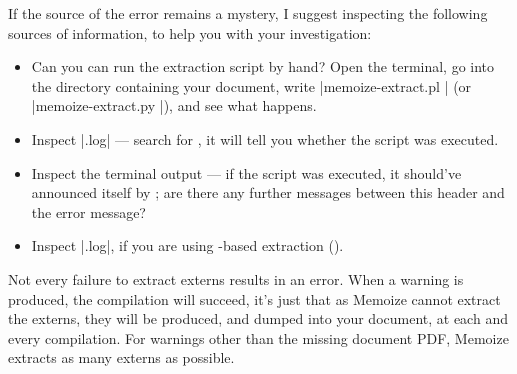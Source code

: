 \documentclass[a4paper,11pt]{article}
\begin{document}
\begin{enumerate}
  If the source of the error remains a mystery, I suggest inspecting the
  following sources of information, to help you with your investigation:
  \begin{itemize}
  \item Can you can run the extraction script by hand?  Open the terminal, go
    into the directory containing your document, write |memoize-extract.pl
    | (or |memoize-extract.py |), and
    see what happens.
  \item Inspect |.log| --- search for
    , it will tell you whether the
    script was executed.
  \item Inspect the  terminal output --- if the script was
    executed, it should've announced itself by ; are there any further messages between this header
    and the error message?
  \item Inspect |.log|, if you are using 
    -based extraction
    ().
  \end{itemize}
  
\end{enumerate}

Not every failure to extract externs results in an error.  When a warning is
produced, the compilation will succeed, it's just that as Memoize cannot
extract the externs, they will be produced, and dumped into your document, at
each and every compilation.  For warnings other than the missing document PDF,
Memoize extracts as many externs as possible.
\end{document}
